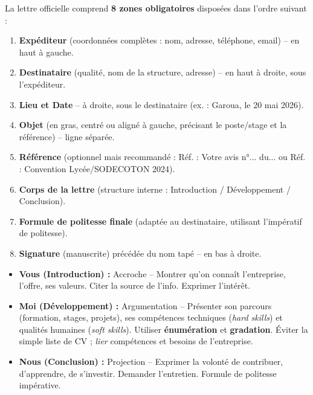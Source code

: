 \documentclass[11pt]{article}
\begin{document}
\begin{definition}
La lettre officielle comprend \textbf{8 zones obligatoires} disposées dans l'ordre suivant :
\begin{enumerate}
    \item \textbf{Expéditeur} (coordonnées complètes : nom, adresse, téléphone, email) -- en haut à gauche.
    \item \textbf{Destinataire} (qualité, nom de la structure, adresse) -- en haut à droite, sous l'expéditeur.
    \item \textbf{Lieu et Date} -- à droite, sous le destinataire (ex. : \og{}Garoua, le 20 mai 2026\fg{}).
    \item \textbf{Objet} (en gras, centré ou aligné à gauche, précisant le poste/stage et la référence) -- ligne séparée.
    \item \textbf{Référence} (optionnel mais recommandé : \og{}Réf. : Votre avis n°... du...\fg{} ou \og{}Réf. : Convention Lycée/SODECOTON 2024\fg{}).
    \item \textbf{Corps de la lettre} (structure interne : Introduction / Développement / Conclusion).
    \item \textbf{Formule de politesse finale} (adaptée au destinataire, utilisant l'impératif de politesse).
    \item \textbf{Signature} (manuscrite) précédée du nom tapé -- en bas à droite.
\end{enumerate}
\end{definition}

\begin{propriete}
\begin{itemize}
    \item \textbf{Vous (Introduction) :} Accroche -- Montrer qu'on connaît l'entreprise, l'offre, ses valeurs. Citer la source de l'info. Exprimer l'intérêt.
    \item \textbf{Moi (Développement) :} Argumentation -- Présenter son parcours (formation, stages, projets), ses compétences techniques (\emph{hard skills}) et qualités humaines (\emph{soft skills}). Utiliser \textbf{énumération} et \textbf{gradation}. Éviter la simple liste de CV ; \emph{lier} compétences et besoins de l'entreprise.
    \item \textbf{Nous (Conclusion) :} Projection -- Exprimer la volonté de contribuer, d'apprendre, de s'investir. Demander l'entretien. Formule de politesse impérative.
\end{itemize}
\end{propriete}
\end{document}
